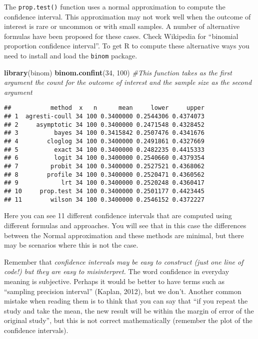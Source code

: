 \documentclass[
]{book}
\newenvironment{Shaded}{\begin{snugshade}}{\end{snugshade}}
\newcommand{\CommentTok}[1]{\textcolor[rgb]{0.56,0.35,0.01}{\textit{#1}}}
\newcommand{\DecValTok}[1]{\textcolor[rgb]{0.00,0.00,0.81}{#1}}
\newcommand{\FunctionTok}[1]{\textcolor[rgb]{0.13,0.29,0.53}{\textbf{#1}}}
\newcommand{\NormalTok}[1]{#1}
\begin{document}
The \texttt{prop.test()} function uses a normal approximation to compute the confidence interval. This approximation may not work well when the outcome of interest is rare or uncommon or with small samples. A number of alternative formulas have been proposed for these cases. Check Wikipedia for ``binomial proportion confidence interval''. To get R to compute these alternative ways you need to install and load the \texttt{binom} package.

\begin{Shaded}
\begin{Highlighting}[]
\FunctionTok{library}\NormalTok{(binom)}
\FunctionTok{binom.confint}\NormalTok{(}\DecValTok{34}\NormalTok{, }\DecValTok{100}\NormalTok{) }\CommentTok{\#This function takes as the first argument the count for the outcome of interest and the sample size as the second argument}
\end{Highlighting}
\end{Shaded}

\begin{verbatim}
##           method  x   n      mean     lower     upper
## 1  agresti-coull 34 100 0.3400000 0.2544306 0.4374073
## 2     asymptotic 34 100 0.3400000 0.2471548 0.4328452
## 3          bayes 34 100 0.3415842 0.2507476 0.4341676
## 4        cloglog 34 100 0.3400000 0.2491861 0.4327669
## 5          exact 34 100 0.3400000 0.2482235 0.4415333
## 6          logit 34 100 0.3400000 0.2540660 0.4379354
## 7         probit 34 100 0.3400000 0.2527521 0.4368062
## 8        profile 34 100 0.3400000 0.2520471 0.4360562
## 9            lrt 34 100 0.3400000 0.2520248 0.4360417
## 10     prop.test 34 100 0.3400000 0.2501177 0.4423445
## 11        wilson 34 100 0.3400000 0.2546152 0.4372227
\end{verbatim}

Here you can see 11 different confidence intervals that are computed using different formulas and approaches. You will see that in this case the differences between the Normal approximation and these methods are minimal, but there may be scenarios where this is not the case.

Remember that \emph{confidence intervals may be easy to construct (just one line of code!) but they are easy to misinterpret.} The word confidence in everyday meaning is subjective. Perhaps it would be better to have terms such as ``sampling precision interval'' (Kaplan, 2012), but we don't. Another common mistake when reading them is to think that you can say that ``if you repeat the study and take the mean, the new result will be within the margin of error of the original study'', but this is not correct mathematically (remember the plot of the confidence intervals).
\end{document}
